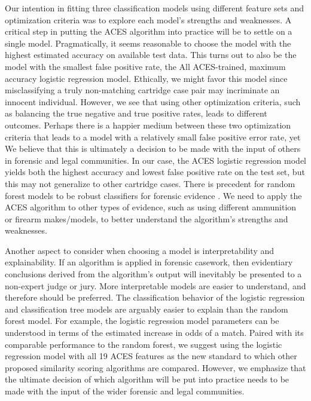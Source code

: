\documentclass[11pt,]{isuthesis}
\begin{document}
Our intention in fitting three classification models using different feature sets and optimization criteria was to explore each model's strengths and weaknesses.
A critical step in putting the ACES algorithm into practice will be to settle on a single model.
Pragmatically, it seems reasonable to choose the model with the highest estimated accuracy on available test data.
This turns out to also be the model with the smallest false positive rate, the All ACES-trained, maximum accuracy logistic regression model.
Ethically, we might favor this model since misclassifying a truly non-matching cartridge case pair may incriminate an innocent individual.
However, we see that using other optimization criteria, such as balancing the true negative and true positive rates, leads to different outcomes.
Perhaps there is a happier medium between these two optimization criteria that leads to a model with a relatively small false positive error rate, yet
We believe that this is ultimately a decision to be made with the input of others in forensic and legal communities.
In our case, the ACES logistic regression model yields both the highest accuracy and lowest false positive rate on the test set, but this may not generalize to other cartridge cases.
There is precedent for random forest models to be robust classifiers for forensic evidence \citep{hare_automatic_2016, Park2019}.
We need to apply the ACES algorithm to other types of evidence, such as using different ammunition or firearm makes/models, to better understand the algorithm's strengths and weaknesses.

Another aspect to consider when choosing a model is interpretability and explainability.
If an algorithm is applied in forensic casework, then evidentiary conclusions derived from the algorithm's output will inevitably be presented to a non-expert judge or jury.
More interpretable models are easier to understand, and therefore should be preferred.
The classification behavior of the logistic regression and classification tree models are arguably easier to explain than the random forest model.
For example, the logistic regression model parameters can be understood in terms of the estimated increase in odds of a match.
Paired with its comparable performance to the random forest, we suggest using the logistic regression model with all 19 ACES features as the new standard to which other proposed similarity scoring algorithms are compared.
However, we emphasize that the ultimate decision of which algorithm will be put into practice needs to be made with the input of the wider forensic and legal communities.
\end{document}
